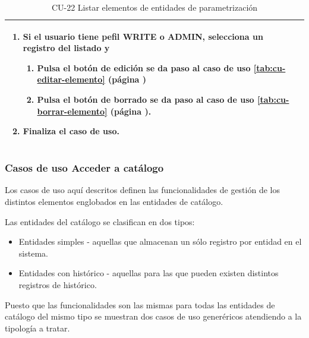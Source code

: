 \begin{table} [H]
{\begin{tabular}{| m{3cm} | m{12cm} |}
\begin{enumerate}
		\item Si el usuario tiene pefil WRITE o ADMIN, selecciona un registro del listado y
		    \begin{enumerate}
		        \item Pulsa el botón de edición se da paso al caso de uso \ref{tab:cu-editar-elemento} (página \pageref{tab:cu-editar-elemento})
		        \item Pulsa el botón de borrado se da paso al caso de uso \ref{tab:cu-borrar-elemento} (página \pageref{tab:cu-borrar-elemento}).
		    \end{enumerate} 
		\item Finaliza el caso de uso.		
	  \end{enumerate} 	  	  
	  \\\hline
    \end{tabular}
    } %
    \caption{CU-22 Listar elementos de entidades de parametrización}
    \label{tab:cu-listar-parametrización}
\end{table}



\subsubsection{Casos de uso Acceder a catálogo} 
\label{sub:cu-catalogo}

Los casos de uso aquí descritos definen las funcionalidades de gestión de los distintos elementos englobados en las entidades de catálogo.

Las entidades del catálogo se clasifican en dos tipos:

\begin{itemize}
  \item Entidades simples - aquellas que almacenan un sólo registro por entidad en el sistema. 
  \item Entidades con histórico - aquellas para las que pueden existen distintos registros de histórico.
 \end{itemize} 

 Puesto que las funcionalidades son las mismas para todas las entidades de catálogo del mismo tipo se muestran dos casos de uso generéricos atendiendo a la tipología a tratar.




